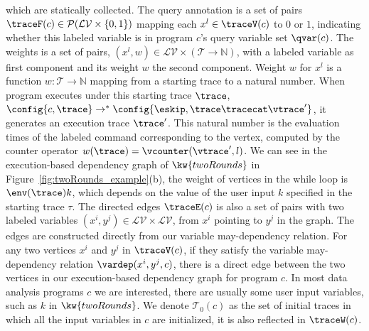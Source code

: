 {which are statically collected.
The query annotation is 
a set of pairs $\traceF(c) \in \mathcal{P}(\mathcal{LV} \times \{0, 1\} )$ 
mapping each $x^l \in \traceV(c)$ to $0$ or $1$, 
indicating whether this labeled variable is in program $c$'s query variable set $\qvar(c)$.
{
The weights is a set of pairs, $(x^l, w) \in \mathcal{LV} \times (\mathcal{T} \to \mathbb{N})$,
with a labeled variable as first component and
its weight $w$ the second component.
Weight $w$ for
$x^l$ is a function $w : \mathcal{T} \to \mathbb{N}$
mapping from a starting trace to a natural number.
When program executes under this starting trace $\trace$,
$\config{{c}, \trace} \to^{*} \config{\eskip, \trace\tracecat\vtrace'} $, it generates an execution trace $\trace'$.
This natural number is the evaluation times of the labeled command corresponding to the vertex, 
computed by the counter operator $w(\trace) = \vcounter(\vtrace', l)$.
We can see in the execution-based dependency graph of $\kw{twoRounds}$ in 
Figure~\ref{fig:twoRounds_example}(b), the weight of vertices in the while loop is  $\env(\trace) k$, which depends on the value of the user input $k$ specified in the starting trace $\tau$.
The directed edges $\traceE({c})$ is also a set of pairs with two labeled variables $ (x^i, y^j) \in \mathcal{LV} \times \mathcal{LV}$, from $x^i$ pointing to $y^j$ in the graph.
The edges are constructed directly from our variable may-dependency relation. 
For any two vertices $x^{i}$ and $y^{j}$ in $\traceV(c)$, if they satisfy the variable may-dependency relation $\vardep(x^i, y^j, c)$, there is a direct edge between the two vertices in our execution-based dependency graph for program $c$.
} 
In most data analysis programs $c$ we are interested, there are usually some user input variables, such as $k$ in $\kw{twoRounds}$. 
We denote $\mathcal{T}_0(c)$ as the set of initial traces in which all the input variables in $c$ are initialized, it is also reflected in $\traceW({c})$.    
}
